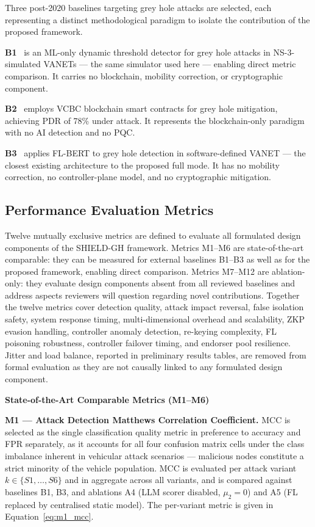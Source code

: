 \documentclass[12pt, a4paper]{report}
\newcommand{\mypar}{\vspace{0.8em}\noindent}
\begin{document}
Three post-2020 baselines targeting grey hole attacks are selected,
each representing a distinct methodological paradigm to isolate
the contribution of the proposed framework.

\textbf{B1}~\cite{malik2023greyhole} is an ML-only dynamic threshold
detector for grey hole attacks in NS-3-simulated VANETs — the same
simulator used here — enabling direct metric comparison. It carries
no blockchain, mobility correction, or cryptographic component.

\textbf{B2}~\cite{alabdulatif2024mitigating} employs VCBC blockchain
smart contracts for grey hole mitigation, achieving PDR of 78\% under
attack. It represents the blockchain-only paradigm with no AI detection
and no PQC.

\textbf{B3}~\cite{ahsan2024flbert} applies FL-BERT to grey hole detection
in software-defined VANET — the closest existing architecture to the
proposed full mode. It has no mobility correction, no controller-plane
model, and no cryptographic mitigation.

\subsection{Performance Evaluation Metrics}
\label{sec:metrics}

Twelve mutually exclusive metrics are defined to evaluate all formulated
design components of the SHIELD-GH framework. Metrics M1--M6 are
state-of-the-art comparable: they can be measured for external baselines
B1--B3 as well as for the proposed framework, enabling direct comparison.
Metrics M7--M12 are ablation-only: they evaluate design components absent
from all reviewed baselines and address aspects reviewers will question
regarding novel contributions. Together the twelve metrics cover detection
quality, attack impact reversal, false isolation safety, system response
timing, multi-dimensional overhead and scalability, ZKP evasion handling,
controller anomaly detection, re-keying complexity, FL poisoning robustness,
controller failover timing, and endorser pool resilience. Jitter and load
balance, reported in preliminary results tables, are removed from formal
evaluation as they are not causally linked to any formulated design component.

\vspace{0.6em}
\noindent\textbf{State-of-the-Art Comparable Metrics (M1--M6)}

\mypar
\textbf{M1 --- Attack Detection Matthews Correlation Coefficient.}
MCC is selected as the single classification quality metric in preference
to accuracy and FPR separately, as it accounts for all four confusion
matrix cells under the class imbalance inherent in vehicular attack
scenarios — malicious nodes constitute a strict minority of the vehicle
population. MCC is evaluated per attack variant $k \in \{S1,\ldots,S6\}$
and in aggregate across all variants, and is compared against baselines B1,
B3, and ablations A4 (LLM scorer disabled, $\mu_2 = 0$) and A5 (FL replaced
by centralised static model). The per-variant metric is given in
Equation~\eqref{eq:m1_mcc}.
\end{document}
